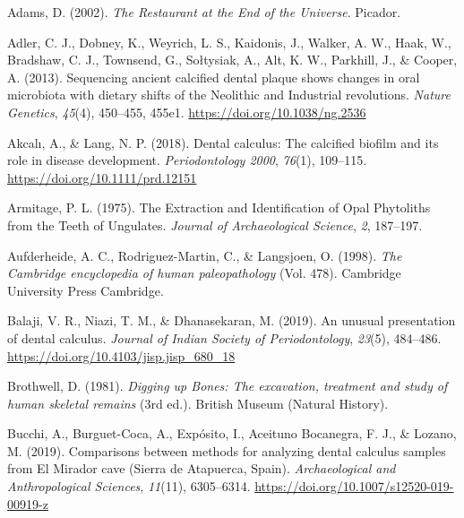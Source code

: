 \documentclass[
  letterpaper,
]{book}
\newlength{\cslhangindent}
\newlength{\cslentryspacingunit} %
\newenvironment{CSLReferences}[2] %
 {%
  \setlength{\parindent}{0pt}
  \ifodd #1
  \let\oldpar\par
  \def\par{\hangindent=\cslhangindent\oldpar}
  \fi
  \setlength{\parskip}{#2\cslentryspacingunit}
 }%
 {}
\begin{document}
\hypertarget{refs-1}{}
\begin{CSLReferences}{1}{0}
\leavevmode{}%
Adams, D. (2002). \emph{The {Restaurant} at the {End} of the
{Universe}}. {Picador}.

\leavevmode{}%
Adler, C. J., Dobney, K., Weyrich, L. S., Kaidonis, J., Walker, A. W.,
Haak, W., Bradshaw, C. J., Townsend, G., Sołtysiak, A., Alt, K. W.,
Parkhill, J., \& Cooper, A. (2013). Sequencing ancient calcified dental
plaque shows changes in oral microbiota with dietary shifts of the
{Neolithic} and {Industrial} revolutions. \emph{Nature Genetics},
\emph{45}(4), 450--455, 455e1. \url{https://doi.org/10.1038/ng.2536}

\leavevmode{}%
Akcalı, A., \& Lang, N. P. (2018). Dental calculus: The calcified
biofilm and its role in disease development. \emph{Periodontology 2000},
\emph{76}(1), 109--115. \url{https://doi.org/10.1111/prd.12151}

\leavevmode{}%
Armitage, P. L. (1975). The {Extraction} and {Identification} of {Opal
Phytoliths} from the {Teeth} of {Ungulates}. \emph{Journal of
Archaeological Science}, \emph{2}, 187--197.

\leavevmode{}%
Aufderheide, A. C., Rodriguez-Martin, C., \& Langsjoen, O. (1998).
\emph{The {Cambridge} encyclopedia of human paleopathology} (Vol. 478).
{Cambridge University Press Cambridge}.

\leavevmode{}%
Balaji, V. R., Niazi, T. M., \& Dhanasekaran, M. (2019). An unusual
presentation of dental calculus. \emph{Journal of Indian Society of
Periodontology}, \emph{23}(5), 484--486.
\url{https://doi.org/10.4103/jisp.jisp_680_18}

\leavevmode{}%
Brothwell, D. (1981). \emph{Digging up {Bones}: {The} excavation,
treatment and study of human skeletal remains} (3rd ed.). {British
Museum (Natural History)}.

\leavevmode{}%
Bucchi, A., Burguet-Coca, A., Expósito, I., Aceituno Bocanegra, F. J.,
\& Lozano, M. (2019). Comparisons between methods for analyzing dental
calculus samples from {El Mirador} cave ({Sierra} de {Atapuerca},
{Spain}). \emph{Archaeological and Anthropological Sciences},
\emph{11}(11), 6305--6314.
\url{https://doi.org/10.1007/s12520-019-00919-z}


\end{CSLReferences}
\end{document}

